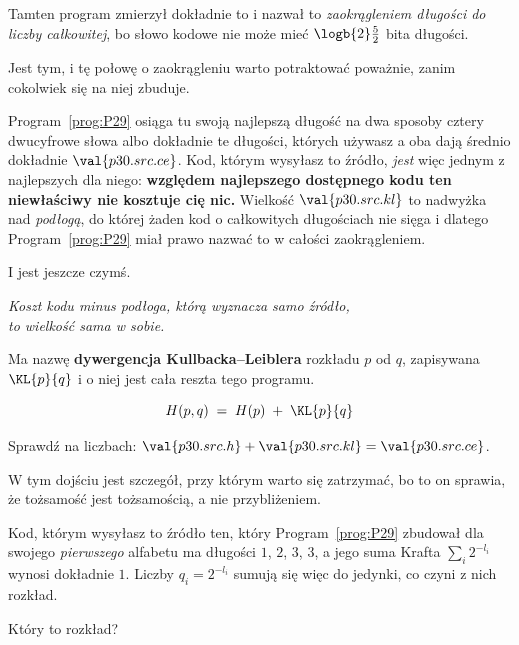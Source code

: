 \begin{fr}

Tamten program zmierzył dokładnie to i nazwał to \emph{zaokrągleniem długości
do liczby całkowitej}, bo słowo kodowe nie może mieć
$\logb{2}\frac{5}{2}$ bita długości.

Jest tym, i tę połowę o zaokrągleniu warto potraktować poważnie, zanim
cokolwiek się na niej zbuduje.

Program~\ref{prog:P29} osiąga tu swoją najlepszą długość na dwa sposoby
\dash{} cztery dwucyfrowe słowa albo dokładnie te długości, których używasz
\dash{} a oba dają średnio dokładnie $\val{p30.src.ce}$. Kod, którym wysyłasz
to źródło, \emph{jest} więc jednym z najlepszych dla niego: \textbf{względem
najlepszego dostępnego kodu ten niewłaściwy nie kosztuje cię nic.} Wielkość
$\val{p30.src.kl}$ to nadwyżka nad \emph{podłogą}, do której żaden kod o
całkowitych długościach nie sięga \dash{} i dlatego
Program~\ref{prog:P29} miał prawo nazwać to w całości zaokrągleniem.

I jest jeszcze czymś.

\begin{center}
\emph{Koszt kodu minus podłoga, którą wyznacza samo źródło,\\
to wielkość sama w sobie.}
\end{center}

Ma nazwę \dash{} \textbf{dywergencja Kullbacka--Leiblera} rozkładu $p$ od
$q$, zapisywana $\KL{p}{q}$ \dash{} i o niej jest cała reszta tego programu.

\[ H(p, q) \;=\; H(p) \;+\; \KL{p}{q} \]

Sprawdź na liczbach: $\val{p30.src.h} + \val{p30.src.kl}
= \val{p30.src.ce}$.
\end{fr}

\begin{fr}
W tym dojściu jest szczegół, przy którym warto się zatrzymać, bo to on
sprawia, że tożsamość jest tożsamością, a nie przybliżeniem.

Kod, którym wysyłasz to źródło \dash{} ten, który Program~\ref{prog:P29}
zbudował dla swojego \emph{pierwszego} alfabetu \dash{} ma długości
$1$, $2$, $3$, $3$, a jego suma Krafta $\sum_i 2^{-l_i}$ wynosi dokładnie
$1$. Liczby $q_i = 2^{-l_i}$ sumują się więc do jedynki, co czyni z nich
rozkład.

Który to rozkład?
\dotline
\nextframe
\end{fr}

